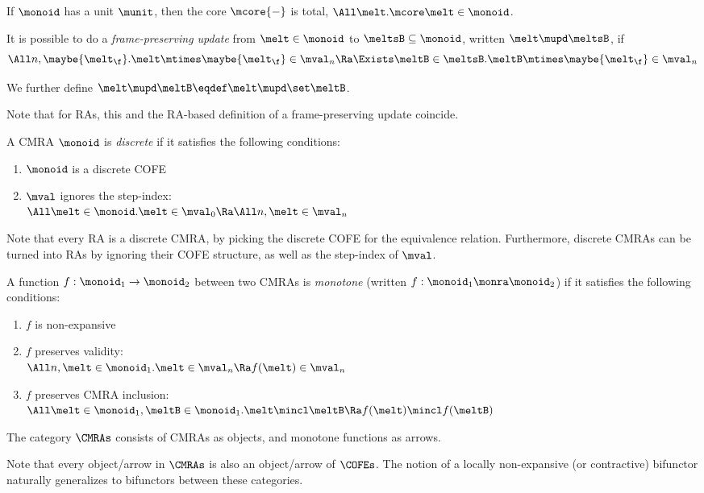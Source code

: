 \begin{lem}
  If $\monoid$ has a unit $\munit$, then the core $\mcore{{-}}$ is total, \ie $\All\melt. \mcore\melt \in \monoid$.
\end{lem}

\begin{defn}
  It is possible to do a \emph{frame-preserving update} from $\melt \in \monoid$ to $\meltsB \subseteq \monoid$, written $\melt \mupd \meltsB$, if
  \[ \All n, \maybe{\melt_\f}. \melt \mtimes \maybe{\melt_\f} \in \mval_n \Ra \Exists \meltB \in \meltsB. \meltB \mtimes \maybe{\melt_\f} \in \mval_n \]

  We further define $\melt \mupd \meltB \eqdef \melt \mupd \set\meltB$.
\end{defn}
Note that for RAs, this and the RA-based definition of a frame-preserving update coincide.

\begin{defn}
  A CMRA $\monoid$ is \emph{discrete} if it satisfies the following conditions:
  \begin{enumerate}[itemsep=0pt]
  \item $\monoid$ is a discrete COFE
  \item $\mval$ ignores the step-index: \\
    $\All \melt \in \monoid. \melt \in \mval_0 \Ra \All n, \melt \in \mval_n$
  \end{enumerate}
\end{defn}
Note that every RA is a discrete CMRA, by picking the discrete COFE for the equivalence relation.
Furthermore, discrete CMRAs can be turned into RAs by ignoring their COFE structure, as well as the step-index of $\mval$.

\begin{defn}
  A function $f : \monoid_1 \to \monoid_2$ between two CMRAs is \emph{monotone} (written $f : \monoid_1 \monra \monoid_2$) if it satisfies the following conditions:
  \begin{enumerate}[itemsep=0pt]
  \item $f$ is non-expansive
  \item $f$ preserves validity: \\
    $\All n, \melt \in \monoid_1. \melt \in \mval_n \Ra f(\melt) \in \mval_n$
  \item $f$ preserves CMRA inclusion:\\
    $\All \melt \in \monoid_1, \meltB \in \monoid_1. \melt \mincl \meltB \Ra f(\melt) \mincl f(\meltB)$
  \end{enumerate}
\end{defn}

\begin{defn}
  The category $\CMRAs$ consists of CMRAs as objects, and monotone functions as arrows.
\end{defn}
Note that every object/arrow in $\CMRAs$ is also an object/arrow of $\COFEs$.
The notion of a locally non-expansive (or contractive) bifunctor naturally generalizes to bifunctors between these categories.


